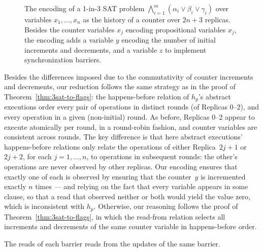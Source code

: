     \begin{figure}[t]
      \centering
      {\scriptsize}
     \vspace{-1mm}
      \caption{The encoding of a 1-in-3 SAT problem $\bigwedge_{i=1}^{m} (\alpha_i \lor \beta_i \lor \gamma_i)$ over variables $x_1, \ldots, x_n$ as the history of a counter over $2n+3$ replicas. Besides the counter variables $x_j$ encoding propositional variables $x_j$, the encoding adds a variable $y$ encoding the number of initial increments and decrements, and a variable $z$ to implement synchronization barriers.}
      \label{fig:3sat-to-counter}
     \vspace{-4mm}
    \end{figure}

     Besides the differences imposed due to the commutativity of counter increments and decrements, our reduction follows the same strategy as in the proof of Theorem~\ref{thm:3sat-to-flags}: the happens-before relation of $h_p$’s abstract executions order every pair of operations in distinct rounds (of Replicas 0–2), and every operation in a given (non-initial) round. As before, Replicas 0–2 appear to execute atomically per round, in a round-robin fashion, and counter variables are consistent across rounds. The key difference is that here abstract executions’ happens-before relations only relate the operations of either Replica~$2j\!+\!1$ or $2j\!+\!2$, for each $j = 1, \ldots, n$, to operations in subsequent rounds: the other’s operations are never observed by other replicas. Our encoding ensures that exactly one of each is observed by ensuring that the counter~$y$ is incremented exactly $n$ times — and relying on the fact that every variable appears in some clause, so that a read that observed neither or both would yield the value zero, which is inconsistent with $h_p$. Otherwise, our reasoning follows the proof of Theorem~\ref{thm:3sat-to-flags}, in which the read-from relation selects all increments and decrements of the same counter variable in happens-before order.
\vspace{-2mm}

\begin{lemma}
  \label{crdt:counter:npc-proof:lemma1}
  The reads of each barrier reads from the updates of the same barrier. 
\end{lemma}

